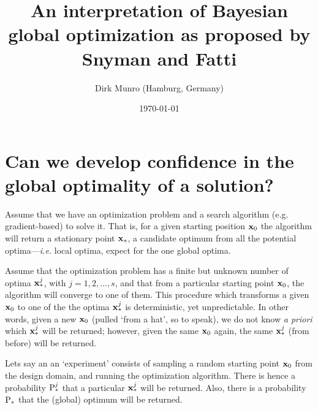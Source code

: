 \documentclass[11pt]{article}
\title{An interpretation of Bayesian global optimization as proposed by Snyman and Fatti \cite{snyman1987}}
\author{Dirk Munro (Hamburg, Germany)}
\date{\today }
\begin{document}
\maketitle

\section{Can we develop confidence in the global optimality of a solution?}

Assume that we have an optimization problem and a search algorithm (e.g. gradient-based) to solve it. That is, for a given starting position $\bx_0$ the algorithm will return a stationary point $\bx_\ast$, a candidate optimum from all the potential optima---\emph{i.e.} local optima, expect for the one global optima. 

Assume that the optimization problem has a finite but unknown number of optima $\bx^j_\ast$, with $j=1,2,\ldots, s$, and that from a particular starting point $\bx_0$, the algorithm will converge to one of them. This procedure which transforms a given $\bx_0$ to one of the the optima $\bx^j_\ast$ is deterministic, yet unpredictable. In other words, given a new $\bx_0$ (pulled `from a hat', so to speak), we do not know \emph{a priori} which $\bx^j_\ast$ will be returned; however, given the same $\bx_0$ again, the same $\bx^j_\ast$ (from before) will be returned.

Lets say an an `experiment' consists of sampling a random starting point $\bx_0$ from the design domain, and running the optimization algorithm. There is hence a probability $\P^j_\ast$ that a particular $\bx^j_\ast$ will be returned. Also, there is a probability $\P_\ast$ that the (global) optimum will be returned.
\end{document}
